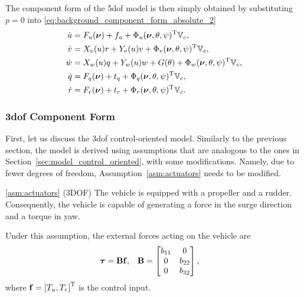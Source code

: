 The component form of the 5\gls{dof} model is then simply obtained by substituting $p = 0$ into \eqref{eq:background_component_form_absolute_2}
\begin{subequations}
    \begin{align}
        \dot{u} &= F_u(\bm{\nu}) + f_u + \Phi_u(\bm{\nu}, \theta, \psi)^{\mathrm{T}}\mathbb{V}_c, \\
        \dot{v} &= X_v(u)r + Y_v(u)v + \Phi_v(\bm{\nu}, \theta, \psi)^{\mathrm{T}}\mathbb{V}_c, \\
        \dot{w} &= X_w(u)q + Y_w(u)w + G(\theta) + \Phi_w(\bm{\nu}, \theta, \psi)^{\mathrm{T}}\mathbb{V}_c, \\
        \dot{q} &= F_q(\bm{\nu}) + t_q + \Phi_q(\bm{\nu}, \theta, \psi)^{\mathrm{T}}\mathbb{V}_c, \\
        \dot{r} &= F_r(\bm{\nu}) + t_r + \Phi_r(\bm{\nu}, \theta, \psi)^{\mathrm{T}}\mathbb{V}_c.
    \end{align}
    \label{eq:background_component_form_5DOF}
\end{subequations}

\subsubsection{3\gls{dof} Component Form}
First, let us discuss the 3\gls{dof} control-oriented model.
Similarly to the previous section, the model is derived using assumptions that are analogous to the ones in Section~\ref{sec:model_control_oriented}, with some modifications.
Namely, due to fewer degrees of freedom, Assumption~\ref{asm:actuators} needs to be modified.

\begin{customasm}{\ref*{asm:actuators} (3DOF)}
    \label{asm:actuators_3DOF}
    The vehicle is equipped with a propeller and a rudder.
    Consequently, the vehicle is capable of generating a force in the surge direction and a torque in yaw.
\end{customasm}

Under this assumption, the external forces acting on the vehicle are
\begin{align}
    \bm{\tau} &= \mathbf{B}\mathbf{f}, &
    \mathbf{B} &= 
    \begin{bmatrix}
        b_{11} & 0 \\ 0 & b_{22} \\ 0 & b_{32}
    \end{bmatrix},
\end{align}
where $\mathbf{f} = \left[T_u, T_r\right]^{\mathrm{T}}$ is the control input.

